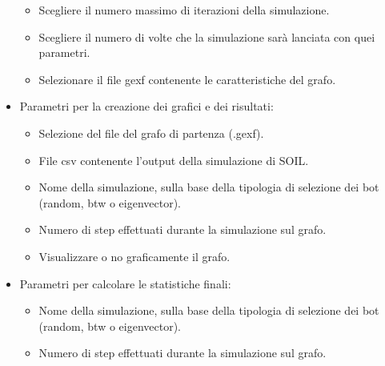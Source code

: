 \begin{itemize}
\begin{itemize}
                \item Scegliere il numero massimo di iterazioni della simulazione.
                \item Scegliere il numero di volte che la simulazione sarà lanciata con quei parametri.
                \item Selezionare il file gexf contenente le caratteristiche del grafo.
              \end{itemize}
            \item Parametri per la creazione dei grafici e dei risultati:
              \begin{itemize}
                \item Selezione del file del grafo di partenza (.gexf).
                \item File csv contenente l’output della simulazione di SOIL.
                \item Nome della simulazione, sulla base della tipologia di selezione dei bot (random, btw o eigenvector).
                \item Numero di step effettuati durante la simulazione sul grafo.
                \item Visualizzare o no graficamente il grafo.
              \end{itemize}
            \item Parametri per calcolare le statistiche finali:
              \begin{itemize}
                \item Nome della simulazione, sulla base della tipologia di selezione dei bot (random, btw o eigenvector).
                \item Numero di step effettuati durante la simulazione sul grafo.
              \end{itemize}
          \end{itemize}
